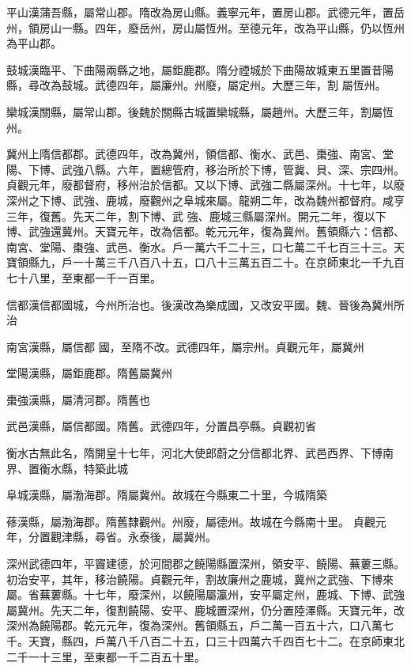 \begin{pinyinscope}
 平山漢蒲吾縣，屬常山郡。隋改為房山縣。義寧元年，置房山郡。武德元年，置岳州，領房山一縣。四年，廢岳州，房山屬恆州。至德元年，改為平山縣，仍以恆州為平山郡。



 鼓城漢臨平、下曲陽兩縣之地，屬鉅鹿郡。隋分禋城於下曲陽故城東五里置昔陽縣，尋改為鼓城。武德四年，屬廉州。州廢，屬定州。大歷三年，割
 屬恆州。



 欒城漢關縣，屬常山郡。後魏於關縣古城置欒城縣，屬趙州。大歷三年，割屬恆州。



 冀州上隋信都郡。武德四年，改為冀州，領信都、衡水、武邑、棗強、南宮、堂陽、下博、武強八縣。六年，置總管府，移治所於下博，管冀、貝、深、宗四州。貞觀元年，廢都督府，移州治於信都。又以下博、武強二縣屬深州。十七年，以廢深州之下博、武強、鹿城，廢觀州之阜城來屬。龍朔二年，改為魏州都督府。咸亨三年，復舊。先天二年，割下博、武
 強、鹿城三縣屬深州。開元二年，復以下博、武強還冀州。天寶元年，改為信都。乾元元年，復為冀州。舊領縣六：信都、南宮、堂陽、棗強、武邑、衡水。戶一萬六千二十三，口七萬二千七百三十三。天寶領縣九，戶一十萬三千八百八十五，口八十三萬五百二十。在京師東北一千九百七十八里，至東都一千一百里。



 信都漢信都國城，今州所治也。後漢改為樂成國，又改安平國。魏、晉後為冀州所治



 南宮漢縣，屬信都
 國，至隋不改。武德四年，屬宗州。貞觀元年，屬冀州



 堂陽漢縣，屬鉅鹿郡。隋舊屬冀州



 棗強漢縣，屬清河郡。隋舊也



 武邑漢縣，屬信都國。隋舊。武德四年，分置昌亭縣。貞觀初省



 衡水古無此名，隋開皇十七年，河北大使郎蔚之分信都北界、武邑西界、下博南界、置衡水縣，特築此城



 阜城漢縣，屬渤海郡。隋屬冀州。故城在今縣東二十里，今城隋築



 蓚漢縣，屬渤海郡。隋舊隸觀州。州廢，屬德州。故城在今縣南十里。
 貞觀元年，分置觀津縣，尋省。永泰後，屬冀州。



 深州武德四年，平竇建德，於河間郡之饒陽縣置深州，領安平、饒陽、蕪蔞三縣。初治安平，其年，移治饒陽。貞觀元年，割故廉州之鹿城，冀州之武強、下博來屬。省蕪蔞縣。十七年，廢深州，以饒陽屬瀛州，安平屬定州，鹿城、下博、武強屬冀州。先天二年，復割饒陽、安平、鹿城置深州，仍分置陸澤縣。天寶元年，改深州為饒陽郡。乾元元年，復為深州。舊領縣五，戶二萬一百五十六，口八萬七
 千。天寶，縣四，戶萬八千八百二十五，口三十四萬六千四百七十二。在京師東北二千一十三里，至東都一千二百五十里。




\end{pinyinscope}
